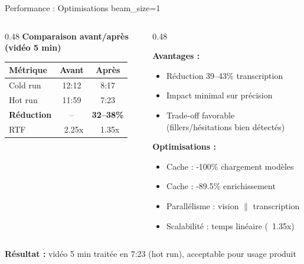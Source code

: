 \documentclass[10pt,aspectratio=169]{beamer}
\begin{document}
\begin{frame}{Performance : Optimisations beam\_size=1}
\begin{columns}[T]
\begin{column}{0.48\textwidth}
\textbf{Comparaison avant/après (vidéo 5 min)}
\vspace{0.1cm}
\begin{tabular}{lcc}
\rowcolor{primary!20}\textbf{Métrique} & \textbf{Avant} & \textbf{Après} \\
\hline
Cold run & 12:12 & 8:17 \\
Hot run & 11:59 & 7:23 \\
\rowcolor{accent!20}\textbf{Réduction} & -- & \textbf{32--38\%} \\
RTF & ~2.25x & ~1.35x \\
\hline
\end{tabular}
\end{column}
\begin{column}{0.48\textwidth}
\begin{tcolorbox}[title=Impact beam\_size=1, colframe=accent, colback=accent!3]
\small
\textbf{Avantages :}
\begin{itemize}
    \item Réduction 39--43\% transcription
    \item Impact minimal sur précision
    \item Trade-off favorable (fillers/hésitations bien détectés)
\end{itemize}
\end{tcolorbox}
\vspace{0.2cm}
\begin{tcolorbox}[title=Cache et parallélisme, colframe=success, colback=success!3]
\small
\textbf{Optimisations :}
\begin{itemize}
    \item Cache : -100\% chargement modèles
    \item Cache : -89.5\% enrichissement
    \item Parallélisme : vision $\parallel$ transcription
    \item Scalabilité : temps linéaire (~1.35x)
\end{itemize}
\end{tcolorbox}
\end{column}
\end{columns}
\vspace{0.2cm}
\begin{keybox}
\textbf{Résultat :} vidéo 5 min traitée en 7:23 (hot run), acceptable pour usage produit
\end{keybox}
\end{frame}
\end{document}
